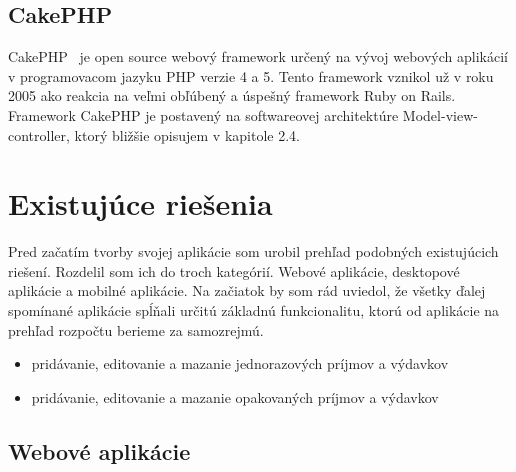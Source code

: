 \documentclass[12pt]{book}
\begin{document}
\subsection{CakePHP} 
CakePHP \cite{CakePHP}\ je open source webový framework určený na vývoj webových aplikácií v programovacom jazyku PHP verzie 4 a 5. Tento framework vznikol už v roku 2005 ako reakcia na veľmi obľúbený a úspešný framework Ruby on Rails. Framework CakePHP je postavený na softwareovej architektúre Model-view-controller, ktorý bližšie opisujem v kapitole 2.4.
 


\section{Existujúce riešenia}
Pred začatím tvorby svojej aplikácie som urobil prehľad podobných existujúcich riešení. Rozdelil som ich do troch kategórií. Webové aplikácie, desktopové aplikácie a mobilné aplikácie.
Na začiatok by som rád uviedol, že všetky ďalej spomínané aplikácie spĺňali určitú základnú funkcionalitu, ktorú od aplikácie na prehľad rozpočtu berieme za samozrejmú.
\begin{itemize}
\item{pridávanie, editovanie a mazanie jednorazových príjmov a výdavkov}
\item{pridávanie, editovanie a mazanie opakovaných príjmov a výdavkov}
\end{itemize}

\subsection{Webové aplikácie}
\end{document}
